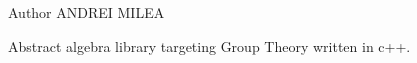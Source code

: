 \begin{DoxyAuthor}{\-Author}
\-A\-N\-D\-R\-E\-I \-M\-I\-L\-E\-A
\end{DoxyAuthor}
\-Abstract algebra library targeting \-Group \-Theory written in c++. 